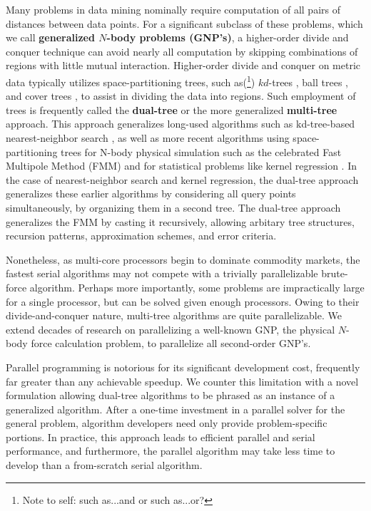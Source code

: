 \documentclass[twoside,leqno,twocolumn]{article}
\newcommand{\authornote}[1]{(\footnote{Note to self: #1})}
\newcommand{\authorsnote}[1]{\authornote{#1}}
\newcommand{\defterm}[1]{{\bf #1}}
\begin{document}
Many problems in data mining nominally require computation of all pairs of distances between data points.
For a significant subclass of these problems, which we call \defterm{generalized $N$-body problems (GNP's)}, a higher-order divide and conquer technique can avoid nearly all computation by skipping combinations of regions with little mutual interaction.
Higher-order divide and conquer on metric data typically utilizes space-partitioning trees, such as\authorsnote{such as...and or such as...or?} $kd$-trees \cite{preparata_kdtrees}, ball trees \cite{anchors_balltrees_moore}, and cover trees \cite{covertrees}, to assist in dividing the data into regions.
Such employment of trees is frequently called the \defterm{dual-tree} or the more generalized \defterm{multi-tree} approach.
This approach generalizes long-used algorithms such as kd-tree-based nearest-neighbor search \cite{friedman_bentley_finkel}, as well as more recent algorithms using space-partitioning trees for N-body physical simulation such as the celebrated Fast Multipole Method (FMM) \cite{greengard_fmm} and for statistical problems like kernel regression \cite{deng_moore}.
In the case of nearest-neighbor search and kernel regression, the dual-tree approach generalizes these earlier algorithms by considering all query points simultaneously, by organizing them in a second tree.
The dual-tree approach generalizes the FMM by casting it recursively, allowing arbitary tree structures, recursion patterns, approximation schemes, and error criteria.

Nonetheless, as multi-core processors begin to dominate commodity markets, the fastest serial algorithms may not compete with a trivially parallelizable brute-force algorithm.
Perhaps more importantly, some problems are impractically large for a single processor, but can be solved given enough processors.
Owing to their divide-and-conquer nature, multi-tree algorithms are quite parallelizable.
We extend decades of research on parallelizing a well-known GNP, the physical $N$-body force calculation problem, to parallelize all second-order GNP's.

Parallel programming is notorious for its significant development cost, frequently far greater than any achievable speedup.
We counter this limitation with a novel formulation allowing dual-tree algorithms to be phrased as an instance of a generalized algorithm.
After a one-time investment in a parallel solver for the general problem, algorithm developers need only provide problem-specific portions.
In practice, this approach leads to efficient parallel and serial performance, and furthermore, the parallel algorithm may take less time to develop than a from-scratch serial algorithm.
\end{document}
